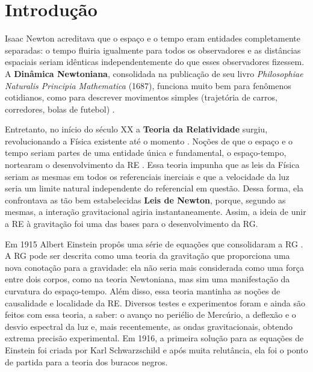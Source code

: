 \documentclass[12pt,a4paper,titlepage,brazil]{article}
\begin{document}

\section{Introdução}

Isaac Newton acreditava que o espaço e o tempo eram entidades completamente separadas: o tempo fluiria igualmente para todos os observadores e as distâncias espaciais seriam idênticas independentemente do que esses observadores fizessem. A {\bf Dinâmica Newtoniana}, consolidada na publicação de seu livro {\em Philosophiae Naturalis Principia Mathematica} (1687), funciona muito bem para fenômenos cotidianos, como para descrever movimentos simples (trajetória de carros, corredores, bolas de futebol) \cite{nightingale2006}.

Entretanto, no início do século XX a {\bf Teoria da Relatividade} surgiu, revolucionando a Física existente até o momento \cite{pires2011}. Noções de que o espaço e o tempo seriam partes de uma entidade única e fundamental, o espaço-tempo, nortearam o desenvolvimento da RE \cite{einstein1905, martins2005}. Essa teoria impunha que as leis da Física seriam as mesmas em todos os referenciais inerciais e que a velocidade da luz seria um limite natural independente do referencial em questão. Dessa forma, ela confrontava as tão bem estabelecidas {\bf Leis de Newton}, porque, segundo as mesmas, a interação gravitacional agiria instantaneamente. Assim, a ideia de unir a RE à gravitação foi uma das bases para o desenvolvimento da RG.

Em 1915 Albert Einstein propôs uma série de equações que consolidaram a RG \cite{einstein1915}. A RG pode ser descrita como uma teoria da gravitação que proporciona uma nova conotação para a gravidade: ela não seria mais considerada como uma força entre dois corpos, como na teoria Newtoniana, mas sim uma manifestação da curvatura do espaço-tempo. Além disso, essa teoria mantinha as noções de causalidade e localidade da RE. Diversos testes e experimentos foram e ainda são feitos com essa teoria, a saber: o avanço no periélio de Mercúrio, a deflexão e o desvio espectral da luz e, mais recentemente, as ondas gravitacionais, obtendo extrema precisão experimental. Em 1916, a primeira solução para as equações de Einstein foi criada por Karl Schwarzschild \cite{schwarzschild1916} e após muita relutância, ela foi o ponto de partida para a teoria dos buracos negros.

\end{document}
